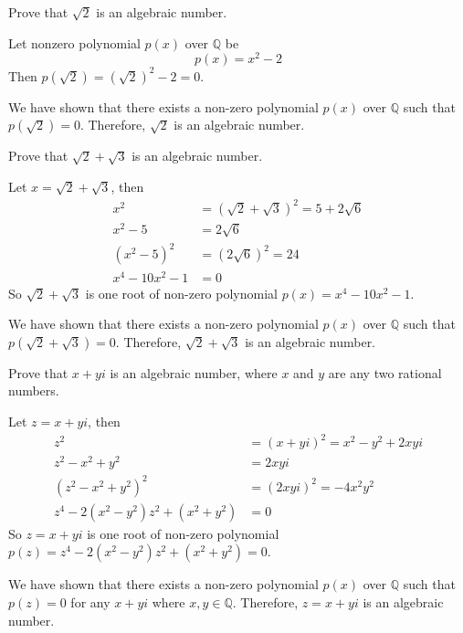 \begin{chapex}
Prove that $\sqrt{2}$ is an algebraic number.
\end{chapex}

\begin{myproof}
    Let nonzero polynomial $p(x)$ over $\mathbb{Q}$ be
    \[
    p(x) = x^2 - 2
    \]
    Then $p(\sqrt{2}) = (\sqrt{2})^2 - 2 = 0$. 
    
    We have shown that there exists a non-zero polynomial $p(x)$ over $\mathbb{Q}$ such that $p(\sqrt{2}) = 0$. Therefore, $\sqrt{2}$ is an algebraic number.
\end{myproof}

\begin{chapex}
Prove that $\sqrt{2} + \sqrt{3}$ is an algebraic number.
\end{chapex}

\begin{myproof}
    Let $x = \sqrt{2} + \sqrt{3}$, then
    \begin{align*}
        x^2 &= (\sqrt{2} + \sqrt{3})^2 = 5+2\sqrt{6}\\
        x^2-5 &= 2\sqrt{6} \\
        (x^2-5)^2 &= (2\sqrt{6})^2 = 24 \\
        x^4-10x^2-1 &=0
    \end{align*}
    So $\sqrt{2} + \sqrt{3}$ is one root of non-zero polynomial $p(x)=x^4-10x^2-1$.
    
    We have shown that there exists a non-zero polynomial $p(x)$ over $\mathbb{Q}$ such that $p(\sqrt{2} + \sqrt{3}) = 0$. Therefore, $\sqrt{2} + \sqrt{3}$ is an algebraic number.
\end{myproof}

\begin{chapex}
\label{cqAlgebraicNumbersEnd}
Prove that $x+yi$ is an algebraic number, where $x$ and $y$ are any two rational numbers.
\end{chapex}

\begin{myproof}
    Let $z = x+yi$, then
    \begin{align*}
        z^2 &= (x+yi)^2 = x^2-y^2+2xyi\\
        z^2-x^2+y^2 &= 2xyi \\
        (z^2-x^2+y^2)^2 &= (2xyi)^2 = -4x^2y^2 \\
        z^4-2(x^2-y^2)z^2+(x^2+y^2) &=0
    \end{align*}
    So $z = x+yi$ is one root of non-zero polynomial $p(z)=z^4-2(x^2-y^2)z^2+(x^2+y^2) =0$.
    
    We have shown that there exists a non-zero polynomial $p(x)$ over $\mathbb{Q}$ such that $p(z) = 0$ for any $x+yi$ where $x,y \in \mathbb{Q}$. Therefore, $z = x+yi$ is an algebraic number.
\end{myproof}

